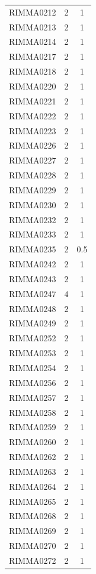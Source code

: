 \documentclass[11pt]{article}
\newcounter{rowno}
\begin{document}
\begin{scriptsize}
\begin{longtable}{>{\stepcounter{rowno}}ccc}
    RIMMA0212 & 2     & 1 \\
    RIMMA0213 & 2     & 1 \\
    RIMMA0214 & 2     & 1 \\
    RIMMA0217 & 2     & 1 \\
    RIMMA0218 & 2     & 1 \\
    RIMMA0220 & 2     & 1 \\
    RIMMA0221 & 2     & 1 \\
    RIMMA0222 & 2     & 1 \\
    RIMMA0223 & 2     & 1 \\
    RIMMA0226 & 2     & 1 \\
    RIMMA0227 & 2     & 1 \\
    RIMMA0228 & 2     & 1 \\
    RIMMA0229 & 2     & 1 \\
    RIMMA0230 & 2     & 1 \\
    RIMMA0232 & 2     & 1 \\
    RIMMA0233 & 2     & 1 \\
    RIMMA0235 & 2     & 0.5 \\
    RIMMA0242 & 2     & 1 \\
    RIMMA0243 & 2     & 1 \\
    RIMMA0247 & 4     & 1 \\
    RIMMA0248 & 2     & 1 \\
    RIMMA0249 & 2     & 1 \\
    RIMMA0252 & 2     & 1 \\
    RIMMA0253 & 2     & 1 \\
    RIMMA0254 & 2     & 1 \\
    RIMMA0256 & 2     & 1 \\
    RIMMA0257 & 2     & 1 \\
    RIMMA0258 & 2     & 1 \\
    RIMMA0259 & 2     & 1 \\
    RIMMA0260 & 2     & 1 \\
    RIMMA0262 & 2     & 1 \\
    RIMMA0263 & 2     & 1 \\
    RIMMA0264 & 2     & 1 \\
    RIMMA0265 & 2     & 1 \\
    RIMMA0268 & 2     & 1 \\
    RIMMA0269 & 2     & 1 \\
    RIMMA0270 & 2     & 1 \\
    RIMMA0272 & 2     & 1 \\

\end{longtable}
\end{scriptsize}
\end{document}
